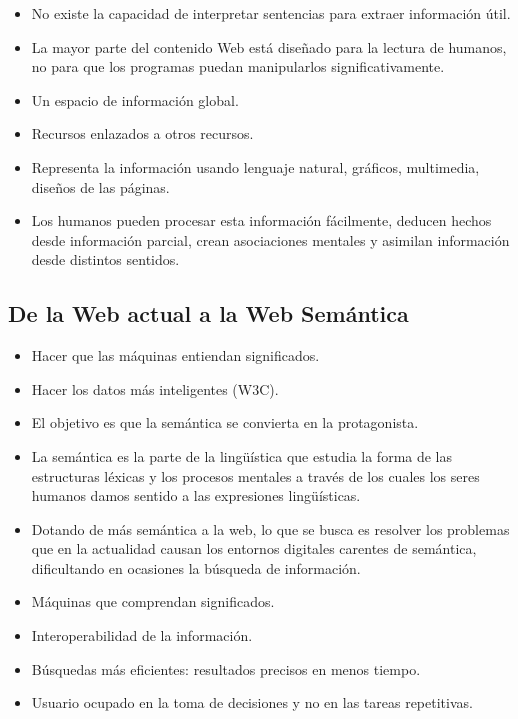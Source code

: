 \documentclass[a4paper,12pt,twoside,final,spanish]{article}
\begin{document}
\begin{itemize}
\item No existe la capacidad de interpretar sentencias para extraer información útil.

\item La mayor parte del contenido Web está diseñado para la lectura de humanos, no para que los programas puedan manipularlos significativamente.

\item Un espacio de información global.

\item Recursos enlazados a otros recursos.

\item Representa la información usando lenguaje natural, gráficos, multimedia, diseños de las páginas.

\item Los humanos pueden procesar esta información fácilmente, deducen hechos desde información parcial, crean asociaciones mentales y asimilan información desde distintos sentidos.
\end{itemize}

\subsection{De la Web actual a la Web Semántica}

\begin{itemize}
\item Hacer que las máquinas entiendan significados.

\item Hacer los datos más inteligentes (W3C).

\item El objetivo es que la semántica se convierta en la protagonista.

\item La semántica es la parte de la lingüística que estudia la forma de las estructuras léxicas y los procesos mentales a través de los cuales los seres humanos damos sentido a las expresiones lingüísticas.

\item Dotando de más semántica a la web, lo que se busca es resolver los problemas que en la actualidad causan los entornos digitales carentes de semántica, dificultando en ocasiones la búsqueda de información.

\item Máquinas que comprendan significados.

\item Interoperabilidad de la información.

\item Búsquedas más eficientes: resultados precisos en menos tiempo.

\item Usuario ocupado en la toma de decisiones y no en las tareas repetitivas.
\end{itemize}
\end{document}
